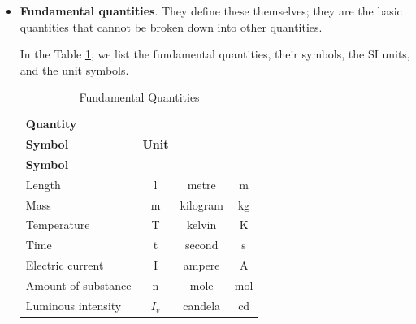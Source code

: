 \begin{itemize}
    \item \textbf{Fundamental quantities}.
    They define these themselves; they are the basic quantities that cannot be broken down into other quantities.

    In the Table \ref{tab:magnitudes_fundamentales}, we list the fundamental quantities, their symbols, the SI units, and the unit symbols.


    \begin{table}[H]
        \centering
        \caption{Fundamental Quantities}
        \vspace{-5pt}
        \begin{tabular}{@{}lccc@{}}
            \toprule
            \textbf{Quantity} & \makecell{\textbf{Quantity} \\ \textbf{Symbol}}              & \textbf{Unit}         & \makecell{\textbf{Unit} \\ \textbf{Symbol}}                \\
            \midrule
            Length         & l         & metre   & \unit{\m} \\[3pt]
            Mass                & m         & kilogram   & \unit{\kilo\g} \\[3pt]
            Temperature    & T         & kelvin   & \unit{\kelvin} \\[3pt]
            Time & t         & second     & \unit{\s} \\[3pt]
            Electric current  & I & ampere  & \unit{\ampere} \\[3pt]
            Amount of substance  & n & mole  & \unit{\mole} \\[3pt]
            Luminous intensity  & \( I_v \) & candela  & \unit{\candela} \\
            \bottomrule
        \end{tabular}
        \label{tab:magnitudes_fundamentales}
    \end{table}


\end{itemize}
